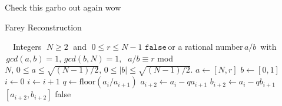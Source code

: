 \documentclass{article}
\newcommand\abs[1]{\left|#1\right|}
\begin{document}
Check this garbo out again wow
\begin{algorithm}
\caption{Farey Reconstruction}\label{farey}
\begin{algorithmic}[1]
\Input $\quad$Integers $\; N \geq 2 \;$ and $\; 0 \leq r \leq N - 1$
\Output $\texttt{false} \,$or a rational number$\, a/b \,$ with$\, gcd(a, b) = 1,\, gcd(b, N) = 1,$ $\; a/b \equiv r $ mod $ N, \, 0 \leq a \leq \sqrt{(N-1)/2}, \, 0 \leq \abs{b} \leq \sqrt{(N-1)/2}.$ 
\State $a \gets [ N, r]$
\State $b \gets [ 0, 1]$
\State $i \gets 0$
	\State $i \gets i + 1$
	\State $q \gets \text{floor}( a_i / a_{i+1})$
	\State $a_{i+2} \gets a_i - qa_{i+1}$
	\State $b_{i+2} \gets a_i - qb_{i+1}$
\EndWhile\\	 
	\State \quad \Return $[ a_{i+2}, b_{i+2}]$
\Else 
	\State \quad \Return false
\EndIf
\EndProcedure
\end{algorithmic}
\end{algorithm}

\begin{appendix}
  \listoffigures
\end{appendix}
\end{document}
